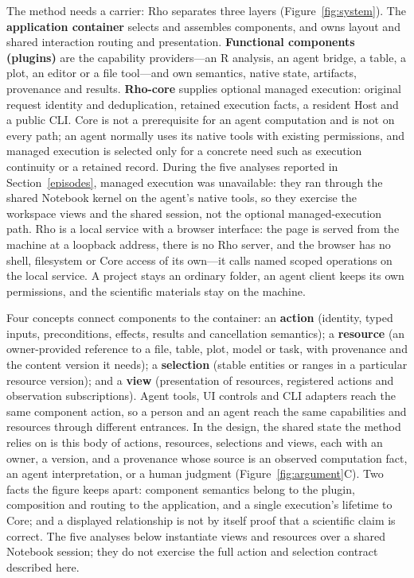 \documentclass[11pt]{article}
\begin{document}
The method needs a carrier: Rho separates three layers (Figure~\ref{fig:system}). The \textbf{application container} selects and assembles components, and owns layout and shared interaction routing and presentation. \textbf{Functional components (plugins)} are the capability providers---an R analysis, an agent bridge, a table, a plot, an editor or a file tool---and own semantics, native state, artifacts, provenance and results. \textbf{Rho-core} supplies optional managed execution: original request identity and deduplication, retained execution facts, a resident Host and a public CLI. Core is not a prerequisite for an agent computation and is not on every path; an agent normally uses its native tools with existing permissions, and managed execution is selected only for a concrete need such as execution continuity or a retained record. During the five analyses reported in Section~\ref{episodes}, managed execution was unavailable: they ran through the shared Notebook kernel on the agent's native tools, so they exercise the workspace views and the shared session, not the optional managed-execution path. Rho is a local service with a browser interface: the page is served from the machine at a loopback address, there is no Rho server, and the browser has no shell, filesystem or Core access of its own---it calls named scoped operations on the local service. A project stays an ordinary folder, an agent client keeps its own permissions, and the scientific materials stay on the machine.

Four concepts connect components to the container: an \textbf{action} (identity, typed inputs, preconditions, effects, results and cancellation semantics); a \textbf{resource} (an owner-provided reference to a file, table, plot, model or task, with provenance and the content version it needs); a \textbf{selection} (stable entities or ranges in a particular resource version); and a \textbf{view} (presentation of resources, registered actions and observation subscriptions). Agent tools, UI controls and CLI adapters reach the same component action, so a person and an agent reach the same capabilities and resources through different entrances. In the design, the shared state the method relies on is this body of actions, resources, selections and views, each with an owner, a version, and a provenance whose source is an observed computation fact, an agent interpretation, or a human judgment (Figure~\ref{fig:argument}C). Two facts the figure keeps apart: component semantics belong to the plugin, composition and routing to the application, and a single execution's lifetime to Core; and a displayed relationship is not by itself proof that a scientific claim is correct. The five analyses below instantiate views and resources over a shared Notebook session; they do not exercise the full action and selection contract described here.
\end{document}
